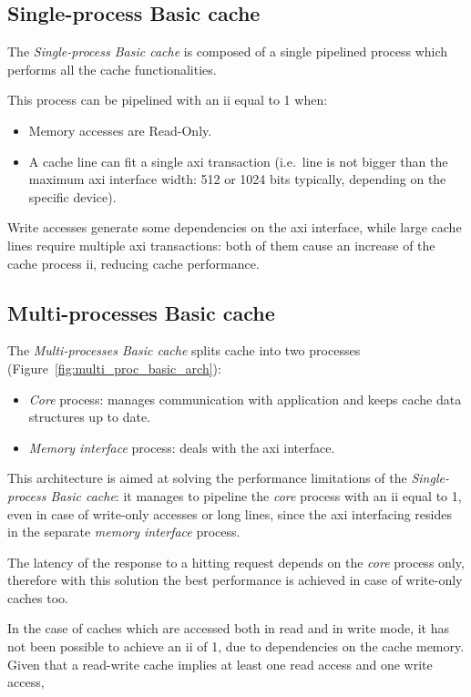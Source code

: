 \documentclass[11pt,a4paper,oneside]{memoir}
\begin{document}
\subsection{Single-process Basic cache}
The \emph{Single-process Basic cache} is composed of a single pipelined process
which performs all the cache functionalities.

This process can be pipelined with an \ac{ii} equal to 1 when:
\begin{itemize}
	\item Memory accesses are Read-Only.
	\item A cache line can fit a single \ac{axi} transaction (i.e.\ line is
		not bigger than the maximum \ac{axi} interface width: 512 or
		1024 bits typically, depending on the specific device).
\end{itemize}

Write accesses generate some dependencies on the \ac{axi} interface, while large
cache lines require multiple \ac{axi} transactions: both of them cause an
increase of the cache process \ac{ii}, reducing cache performance.

\subsection{Multi-processes Basic cache}
The \emph{Multi-processes Basic cache} splits cache into two processes
(Figure~\ref{fig:multi_proc_basic_arch}):
\begin{itemize}
	\item \emph{Core} process: manages communication with application and
		keeps cache data structures up to date.
	\item \emph{Memory interface} process: deals with the \ac{axi}
		interface.
\end{itemize}

This architecture is aimed at solving the performance limitations of the
\emph{Single-process Basic cache}: it manages to pipeline the \emph{core}
process with an \ac{ii} equal to 1, even in case of write-only accesses or long
lines, since the \ac{axi} interfacing resides in the separate \emph{memory
interface} process.

The latency of the response to a hitting request depends on the \emph{core}
process only, therefore with this solution the best performance is achieved in
case of write-only caches too.

\bigskip
In the case of caches which are accessed both in read and in write mode, it has
not been possible to achieve an \ac{ii} of 1, due to dependencies on the cache
memory.
Given that a read-write cache implies at least one read access and one write
access, 
\end{document}
